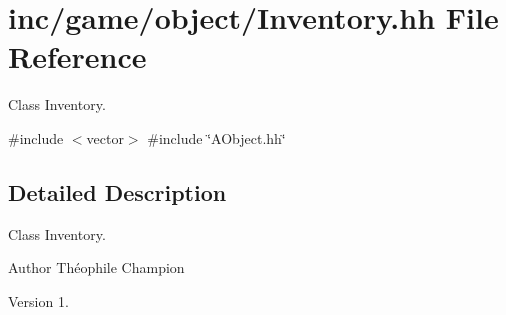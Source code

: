 \hypertarget{Inventory_8hh}{}\section{inc/game/object/\+Inventory.hh File Reference}
\label{Inventory_8hh}


Class Inventory.  


{\ttfamily \#include $<$vector$>$}\newline
{\ttfamily \#include \char`\"{}A\+Object.\+hh\char`\"{}}\newline


\subsection{Detailed Description}
Class Inventory. 

\begin{DoxyAuthor}{Author}
Théophile Champion 
\end{DoxyAuthor}
\begin{DoxyVersion}{Version}
1. 
\end{DoxyVersion}
